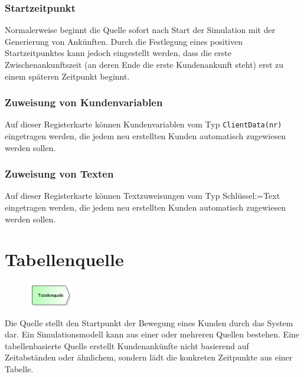 \subsubsection*{Startzeitpunkt}

Normalerweise beginnt die Quelle sofort nach Start der Simulation mit der Generierung von
Ankünften. Durch die Festlegung eines positiven Startzeitpunktes kann jedoch eingestellt
werden, dass die erste Zwischenankunftszeit (an deren Ende die erste Kundenankunft steht) erst
zu einem späteren Zeitpunkt beginnt.

\subsubsection*{Zuweisung von Kundenvariablen}

Auf dieser Registerkarte können Kundenvariablen vom Typ \texttt{ClientData(nr)} eingetragen werden,
die jedem neu erstellten Kunden automatisch zugewiesen werden sollen.

\subsubsection*{Zuweisung von Texten}

Auf dieser Registerkarte können Textzuweisungen vom Typ Schlüssel:=Text eingetragen werden,
die jedem neu erstellten Kunden automatisch zugewiesen werden sollen.


\section{Tabellenquelle}
\label{ref:ModelElementSourceTable}

\begin{figure}
\vspace{-22pt}
\includegraphics[width=2cm]{imageModelElementSourceTable.png}
\vspace{-22pt}
\end{figure}

Die Quelle stellt den Startpunkt der Bewegung eines Kunden durch das System dar.
Ein Simulationsmodell kann aus einer oder mehreren Quellen bestehen.
Eine tabellenbasierte Quelle erstellt Kundenankünfte nicht basierend auf
Zeitabständen oder ähnlichem, sondern lädt die konkreten Zeitpunkte aus einer
Tabelle.

